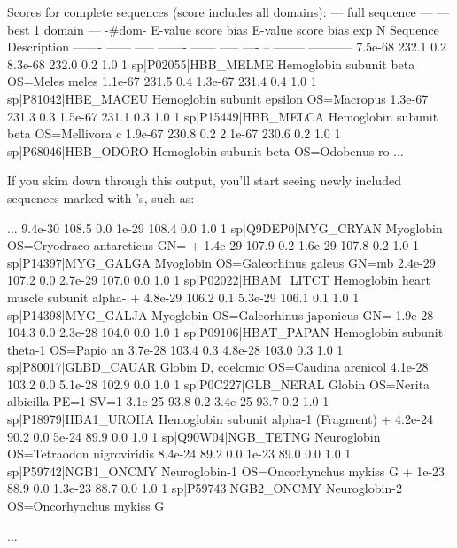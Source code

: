 \begin{samepage}
\begin{sreoutput}
Scores for complete sequences (score includes all domains):
   --- full sequence ---   --- best 1 domain ---    -#dom-
    E-value  score  bias    E-value  score  bias    exp  N  Sequence              Description
    ------- ------ -----    ------- ------ -----   ---- --  --------              -----------
    7.5e-68  232.1   0.2    8.3e-68  232.0   0.2    1.0  1  sp|P02055|HBB_MELME    Hemoglobin subunit beta OS=Meles meles
    1.1e-67  231.5   0.4    1.3e-67  231.4   0.4    1.0  1  sp|P81042|HBE_MACEU    Hemoglobin subunit epsilon OS=Macropus
    1.3e-67  231.3   0.3    1.5e-67  231.1   0.3    1.0  1  sp|P15449|HBB_MELCA    Hemoglobin subunit beta OS=Mellivora c
    1.9e-67  230.8   0.2    2.1e-67  230.6   0.2    1.0  1  sp|P68046|HBB_ODORO    Hemoglobin subunit beta OS=Odobenus ro
...
\end{sreoutput}
\end{samepage}

If you skim down through this output, you'll start seeing newly
included sequences marked with \ccode{+}'s, such as:

\begin{samepage}
\begin{sreoutput}
...
    9.4e-30  108.5   0.0      1e-29  108.4   0.0    1.0  1  sp|Q9DEP0|MYG_CRYAN    Myoglobin OS=Cryodraco antarcticus GN=
+   1.4e-29  107.9   0.2    1.6e-29  107.8   0.2    1.0  1  sp|P14397|MYG_GALGA    Myoglobin OS=Galeorhinus galeus GN=mb
    2.4e-29  107.2   0.0    2.7e-29  107.0   0.0    1.0  1  sp|P02022|HBAM_LITCT   Hemoglobin heart muscle subunit alpha-
+   4.8e-29  106.2   0.1    5.3e-29  106.1   0.1    1.0  1  sp|P14398|MYG_GALJA    Myoglobin OS=Galeorhinus japonicus GN=
    1.9e-28  104.3   0.0    2.3e-28  104.0   0.0    1.0  1  sp|P09106|HBAT_PAPAN   Hemoglobin subunit theta-1 OS=Papio an
    3.7e-28  103.4   0.3    4.8e-28  103.0   0.3    1.0  1  sp|P80017|GLBD_CAUAR   Globin D, coelomic OS=Caudina arenicol
    4.1e-28  103.2   0.0    5.1e-28  102.9   0.0    1.0  1  sp|P0C227|GLB_NERAL    Globin OS=Nerita albicilla PE=1 SV=1
    3.1e-25   93.8   0.2    3.4e-25   93.7   0.2    1.0  1  sp|P18979|HBA1_UROHA   Hemoglobin subunit alpha-1 (Fragment)
+   4.2e-24   90.2   0.0      5e-24   89.9   0.0    1.0  1  sp|Q90W04|NGB_TETNG    Neuroglobin OS=Tetraodon nigroviridis
    8.4e-24   89.2   0.0      1e-23   89.0   0.0    1.0  1  sp|P59742|NGB1_ONCMY   Neuroglobin-1 OS=Oncorhynchus mykiss G
+     1e-23   88.9   0.0    1.3e-23   88.7   0.0    1.0  1  sp|P59743|NGB2_ONCMY   Neuroglobin-2 OS=Oncorhynchus mykiss G    
    
...
\end{sreoutput}
\end{samepage}

